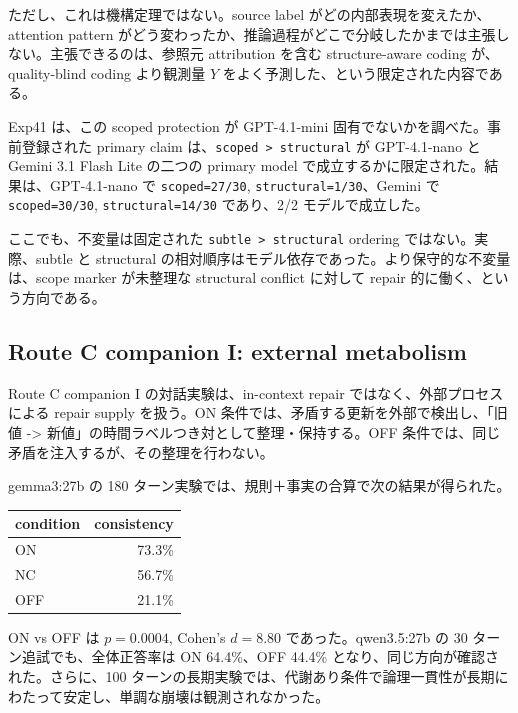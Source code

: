 \documentclass[12pt,a4paper]{article}
\begin{document}
ただし、これは機構定理ではない。source label がどの内部表現を変えたか、attention pattern がどう変わったか、推論過程がどこで分岐したかまでは主張しない。主張できるのは、参照元 attribution を含む structure-aware coding が、quality-blind coding より観測量 \(Y\) をよく予測した、という限定された内容である。

Exp41 は、この scoped protection が GPT-4.1-mini 固有でないかを調べた。事前登録された primary claim は、\texttt{scoped\ \textgreater{}\ structural} が GPT-4.1-nano と Gemini 3.1 Flash Lite の二つの primary model で成立するかに限定された。結果は、GPT-4.1-nano で \texttt{scoped=27/30}, \texttt{structural=1/30}、Gemini で \texttt{scoped=30/30}, \texttt{structural=14/30} であり、2/2 モデルで成立した。

ここでも、不変量は固定された \texttt{subtle\ \textgreater{}\ structural} ordering ではない。実際、subtle と structural の相対順序はモデル依存であった。より保守的な不変量は、scope marker が未整理な structural conflict に対して repair 的に働く、という方向である。

\subsection{Route C companion I: external metabolism}\label{route-c-companion-i-external-metabolism}

Route C companion I の対話実験は、in-context repair ではなく、外部プロセスによる repair supply を扱う。ON 条件では、矛盾する更新を外部で検出し、「旧値 -\textgreater{} 新値」の時間ラベルつき対として整理・保持する。OFF 条件では、同じ矛盾を注入するが、その整理を行わない。

gemma3:27b の 180 ターン実験では、規則＋事実の合算で次の結果が得られた。

{\def\LTcaptype{table} %
\begin{longtable}[]{@{}lr@{}}
\toprule\noalign{}
condition & consistency \\
\midrule\noalign{}
\endhead
\bottomrule\noalign{}
\endlastfoot
ON & 73.3\% \\
NC & 56.7\% \\
OFF & 21.1\% \\
\end{longtable}
}

ON vs OFF は \(p=0.0004\), Cohen's \(d=8.80\) であった。qwen3.5:27b の 30 ターン追試でも、全体正答率は ON 64.4\%、OFF 44.4\% となり、同じ方向が確認された。さらに、100 ターンの長期実験では、代謝あり条件で論理一貫性が長期にわたって安定し、単調な崩壊は観測されなかった。
\end{document}
